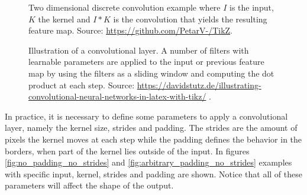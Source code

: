 \begin{itemize}
\begin{figure}
        \centering
        
        \caption[Two dimensional discrete convolution example]{Two dimensional discrete convolution example where $I$ is the input, $K$ the kernel and $I*K$ is the convolution that yields the resulting feature map. Source: \url{https://github.com/PetarV-/TikZ}.}
        \label{fig:2dconv-ex}
    \end{figure}
    \begin{figure}
    	\centering
    	
    	\caption[Illustration of a convolutional layer]{Illustration of a convolutional layer. A number of filters with learnable parameters are applied to the input or previous feature map by using the filters as a sliding window and computing the dot product at each step. Source: \url{https://davidstutz.de/illustrating-convolutional-neural-networks-in-latex-with-tikz/} \cite{conv-graphs}.}
    	\label{fig:filters}
    \end{figure}

    In practice, it is necessary to define some parameters to apply a convolutional layer, namely the kernel size, strides and padding. The strides are the amount of pixels the kernel moves at each step while the padding defines the behavior in the borders, when part of the kernel lies outside of the input. In figures \ref{fig:no_padding_no_strides} and \ref{fig:arbitrary_padding_no_strides} examples with specific input, kernel, strides and padding are shown. Notice that all of these parameters will affect the shape of the output. 
    

\end{itemize}
